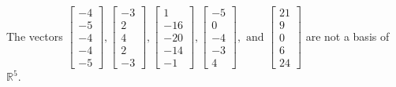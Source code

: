 \begin{exercise}
\begin{exerciseStatement}
  \end{exerciseStatement}
  \begin{exerciseAnswer}
   The vectors \(\left[\begin{array}{r}
-4 \\
-5 \\
-4 \\
-4 \\
-5
\end{array}\right] , \left[\begin{array}{r}
-3 \\
2 \\
4 \\
2 \\
-3
\end{array}\right] , \left[\begin{array}{r}
1 \\
-16 \\
-20 \\
-14 \\
-1
\end{array}\right] , \left[\begin{array}{r}
-5 \\
0 \\
-4 \\
-3 \\
4
\end{array}\right] , \text{ and } \left[\begin{array}{r}
21 \\
9 \\
0 \\
6 \\
24
\end{array}\right]\) 
  	 are not  a basis of \(\mathbb{R}^5\).
  


  \end{exerciseAnswer}
\end{exercise}